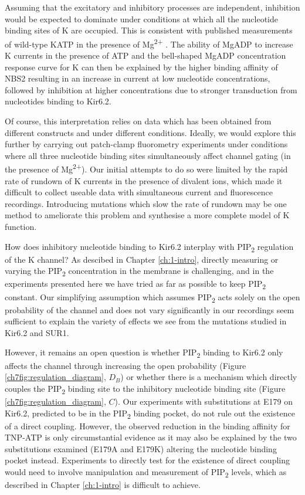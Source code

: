 Assuming that the excitatory and inhibitory processes are independent, inhibition would be expected to dominate under conditions at which all the nucleotide binding sites of K\ATP{} are occupied.
This is consistent with published measurements of wild-type KATP in the presence of Mg\textsuperscript{2+} \cite{proks_activation_2010}.
The ability of MgADP to increase K\ATP{} currents in the presence of ATP \cite{gribble_mgatp_1998-1} and the bell-shaped MgADP concentration response curve for K\ATP{} \cite{proks_activation_2010, vedovato_nucleotide-binding_2015} can then be explained by the higher binding affinity of NBS2 resulting in an increase in current at low nucleotide concentrations, followed by inhibition at higher concentrations due to stronger transduction from nucleotides binding to Kir6.2.

Of course, this interpretation relies on data which has been obtained from different constructs and under different conditions.
Ideally, we would explore this further by carrying out patch-clamp fluorometry experiments under conditions where all three nucleotide binding sites simultaneously affect channel gating (in the presence of Mg\textsuperscript{2+}).
Our initial attempts to do so were limited by the rapid rate of rundown of K\ATP{} currents in the presence of divalent ions, which made it difficult to collect useable data with simultaneous current and fluorescence recordings.
Introducing mutations which slow the rate of rundown may be one method to ameliorate this problem and synthesise a more complete model of K\ATP{} function.

How does inhibitory nucleotide binding to Kir6.2 interplay with PIP\textsubscript{2} regulation of the K\ATP{} channel?
As descibed in Chapter \ref{ch:1-intro}, directly measuring or varying the PIP\textsubscript{2} concentration in the membrane is challenging, and in the experiments presented here we have tried as far as possible to keep PIP\textsubscript{2} constant.
Our simplifying assumption which assumes PIP\textsubscript{2} acts solely on the open probability of the channel and does not vary significantly in our recordings seem sufficient to explain the variety of effects we see from the mutations studied in Kir6.2 and SUR1.

However, it remains an open question is whether PIP\textsubscript{2} binding to Kir6.2 only affects the channel through increasing the open probability (Figure \ref{ch7fig:regulation_diagram}, $D_B$) or whether there is a mechanism which directly couples the PIP\textsubscript{2} binding site to the inhibitory nucleotide binding site (Figure \ref{ch7fig:regulation_diagram}, $C$).
Our experiments with substitutions at E179 on Kir6.2, predicted to be in the PIP\textsubscript{2} binding pocket, do not rule out the existence of a direct coupling.
However, the observed reduction in the binding affinity for TNP-ATP is only circumstantial evidence as it may also be explained by the two substitutions examined (E179A and E179K) altering the nucleotide binding pocket instead.
Experiments to directly test for the existence of direct coupling would need to involve manipulation and measurement of PIP\textsubscript{2} levels, which as described in Chapter \ref{ch:1-intro} is difficult to achieve.